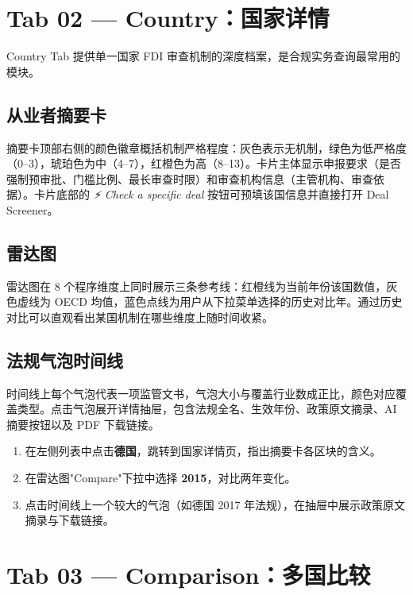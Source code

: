 \documentclass[12pt,a4paper]{article}
\newcommand{\uielem}[1]{\textit{#1}}
\begin{document}
\section{Tab 02 — Country：国家详情}

Country Tab 提供单一国家 FDI 审查机制的深度档案，是合规实务查询最常用的模块。

\subsection{从业者摘要卡}

摘要卡顶部右侧的颜色徽章概括机制严格程度：灰色表示无机制，绿色为低严格度（0–3），琥珀色为中（4–7），红橙色为高（8–13）。卡片主体显示申报要求（是否强制预审批、门槛比例、最长审查时限）和审查机构信息（主管机构、审查依据）。卡片底部的 \uielem{⚡ Check a specific deal} 按钮可预填该国信息并直接打开 Deal Screener。

\subsection{雷达图}

雷达图在 8 个程序维度上同时展示三条参考线：红橙线为当前年份该国数值，灰色虚线为 OECD 均值，蓝色点线为用户从下拉菜单选择的历史对比年。通过历史对比可以直观看出某国机制在哪些维度上随时间收紧。

\subsection{法规气泡时间线}

时间线上每个气泡代表一项监管文书，气泡大小与覆盖行业数成正比，颜色对应覆盖类型。点击气泡展开详情抽屉，包含法规全名、生效年份、政策原文摘录、AI 摘要按钮以及 PDF 下载链接。

\begin{demobox}
  \begin{enumerate}
    \item 在左侧列表中点击\textbf{德国}，跳转到国家详情页，指出摘要卡各区块的含义。
    \item 在雷达图"Compare"下拉中选择 \textbf{2015}，对比两年变化。
    \item 点击时间线上一个较大的气泡（如德国 2017 年法规），在抽屉中展示政策原文摘录与下载链接。
  \end{enumerate}
\end{demobox}

\section{Tab 03 — Comparison：多国比较}
\end{document}
